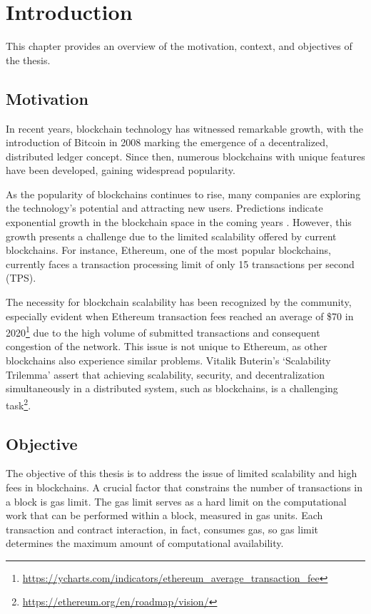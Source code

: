 \chapter{Introduction}\label{cha:chapter1}

This chapter provides an overview of the motivation, context, and objectives of the thesis.

\section{Motivation}\label{sec:moti}

In recent years, blockchain technology has witnessed remarkable growth, with the introduction of Bitcoin in 2008 \cite{nakamoto_bitcoin_2008} marking the emergence of a decentralized, distributed ledger concept. Since then, numerous blockchains with unique features have been developed, gaining widespread popularity.

As the popularity of blockchains continues to rise, many companies are exploring the technology's potential and attracting new users. Predictions indicate exponential growth in the blockchain space in the coming years \cite{noauthor_global_nodate}. However, this growth presents a challenge due to the limited scalability offered by current blockchains. For instance, Ethereum, one of the most popular blockchains, currently faces a transaction processing limit of only 15 transactions per second (TPS).

The necessity for blockchain scalability has been recognized by the community, especially evident when Ethereum transaction fees reached an average of \$70 in 2020\footnote{\url{https://ycharts.com/indicators/ethereum_average_transaction_fee}} due to the high volume of submitted transactions and consequent congestion of the network. This issue is not unique to Ethereum, as other blockchains also experience similar problems. Vitalik Buterin's `Scalability Trilemma' assert that achieving scalability, security, and decentralization simultaneously in a distributed system, such as blockchains, is a challenging task\footnote{\url{https://ethereum.org/en/roadmap/vision/}}.

\section{Objective}\label{sec:objective}

The objective of this thesis is to address the issue of limited scalability and high fees in blockchains. A crucial factor that constrains the number of transactions in a block is gas limit. The gas limit serves as a hard limit on the computational work that can be performed within a block, measured in gas units. Each transaction and contract interaction, in fact, consumes gas, so gas limit determines the maximum amount of computational availability.

